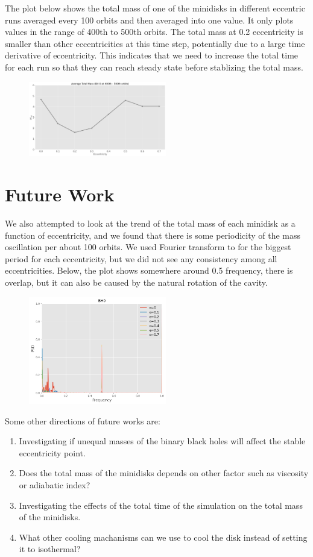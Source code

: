 \documentclass{article}
\begin{document}
The plot below shows the total mass of one of the minidisks in different 
eccentric runs averaged every 100 orbits and then averaged into one value. 
It only plots values in the range of 400th to 500th orbits. 
The total mass at 0.2 eccentricity is smaller than other eccentricities at this time step, 
potentially due to a large time derivative of eccentricity. This indicates that we need to increase the total time for each run so that they can reach steady state before stablizing the total mass.

\begin{figure}[h]
    \includegraphics[width=6cm]{minidisk.png}
    \centering
    \end{figure}


\section{Future Work}
We also attempted to look at the trend of the total mass of each minidisk as a function of eccentricity, and we found that there is some periodicity of the mass oscillation
per about 100 orbits. We used Fourier transform to for the biggest period for each eccentricity, but we did not see any consistency among all eccentricities. Below, the plot
shows somewhere around 0.5 frequency, there is overlap, but it can also be caused by the natural rotation of the cavity. 

\begin{figure}[h]
    \includegraphics[width=6cm]{frequency.png}
    \centering
    \end{figure}

Some other directions of future works are:

\begin{enumerate}
    \item Investigating if unequal masses of the binary black holes will affect the stable eccentricity point.
    \item Does the total mass of the minidisks depends on other factor such as viscosity or adiabatic index?
    \item Investigating the effects of the total time of the simulation on the total mass of the minidisks.
    \item What other cooling machanisms can we use to cool the disk instead of setting it to isothermal?
\end{enumerate}
\end{document}

